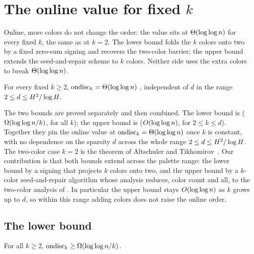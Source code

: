 \section{The online value for fixed $k$}\label{sec:online}

Online, more colors do not change the order: the value sits at $\Theta(\log\log n)$ for every fixed $k$, the same as at $k=2$.
The lower bound folds the $k$ colors onto two by a fixed zero-sum signing and recovers the two-color barrier; the upper bound
extends the seed-and-repair scheme to $k$ colors. Neither side uses the extra colors to break $\Theta(\log\log n)$.

\begin{theorem}\label{thm:online}
For every fixed $k\ge 2$, $\mathrm{ondisc}_k=\Theta(\log\log n)$ \whp, independent of $d$ in the range $2\le d\le H^2/\log H$.
\end{theorem}

The two bounds are proved separately and then combined. The lower bound is  ($\Omega(\log\log n/k)$, for
all $k$); the upper bound is  ($O(\log\log n)$, for $2\le k\le d$). Together they pin the online value
at $\mathrm{ondisc}_k=\Theta(\log\log n)$ once $k$ is constant, with no dependence on the sparsity $d$ across the whole range
$2\le d\le H^2/\log H$. The two-color case $k=2$ is the theorem of Altschuler and Tikhomirov~\cite{AT2025}. Our
contribution is that both bounds extend across the palette range: the lower bound by a signing that projects $k$ colors onto
two, and the upper bound by a $k$-color seed-and-repair algorithm whose analysis reduces, color count and all, to the
two-color analysis of \cite{AT2025}. In particular the upper bound stays $O(\log\log n)$ as $k$ grows up to $d$, so within
this range adding colors does not raise the online order.

\subsection{The lower bound}\label{sec:online-lower}

\begin{lemma}\label{lem:online-lower}
For all $k\ge 2$, $\mathrm{ondisc}_k\ge\Omega(\log\log n/k)$.
\end{lemma}


